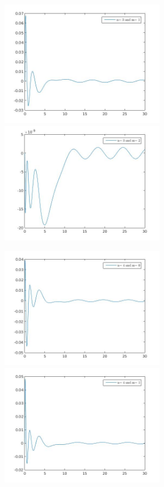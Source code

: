\documentclass{article}
\begin{document}
 \begin{figure}[h!]
\centering 
 	  \begin{minipage}{0.48\textwidth}
     \centering
     \advance\leftskip-2cm
  \includegraphics[width=70mm,scale=2]{assets/try31.jpg}
   \end{minipage} \hfill
    \begin{minipage}{0.48\textwidth}
  \includegraphics[width=70mm,scale=2]{assets/try32.jpg}
  \end{minipage}
\end{figure}
\clearpage
 \begin{figure}[h!]
\centering 
 	  \begin{minipage}{0.48\textwidth}
     \centering
     \advance\leftskip-2cm
  \includegraphics[width=70mm,scale=2]{assets/try40.jpg}
   \end{minipage} \hfill
    \begin{minipage}{0.48\textwidth}
  \includegraphics[width=70mm,scale=2]{assets/try41.jpg}
  \end{minipage}
\end{figure}
\end{document}

